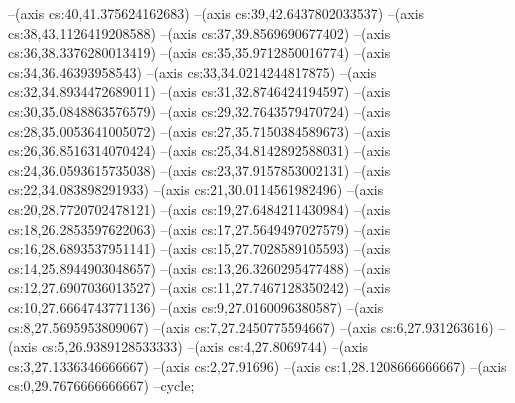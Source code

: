 --(axis cs:40,41.375624162683)
--(axis cs:39,42.6437802033537)
--(axis cs:38,43.1126419208588)
--(axis cs:37,39.8569690677402)
--(axis cs:36,38.3376280013419)
--(axis cs:35,35.9712850016774)
--(axis cs:34,36.46393958543)
--(axis cs:33,34.0214244817875)
--(axis cs:32,34.8934472689011)
--(axis cs:31,32.8746424194597)
--(axis cs:30,35.0848863576579)
--(axis cs:29,32.7643579470724)
--(axis cs:28,35.0053641005072)
--(axis cs:27,35.7150384589673)
--(axis cs:26,36.8516314070424)
--(axis cs:25,34.8142892588031)
--(axis cs:24,36.0593615735038)
--(axis cs:23,37.9157853002131)
--(axis cs:22,34.083898291933)
--(axis cs:21,30.0114561982496)
--(axis cs:20,28.7720702478121)
--(axis cs:19,27.6484211430984)
--(axis cs:18,26.2853597622063)
--(axis cs:17,27.5649497027579)
--(axis cs:16,28.6893537951141)
--(axis cs:15,27.7028589105593)
--(axis cs:14,25.8944903048657)
--(axis cs:13,26.3260295477488)
--(axis cs:12,27.6907036013527)
--(axis cs:11,27.7467128350242)
--(axis cs:10,27.6664743771136)
--(axis cs:9,27.0160096380587)
--(axis cs:8,27.5695953809067)
--(axis cs:7,27.2450775594667)
--(axis cs:6,27.931263616)
--(axis cs:5,26.9389128533333)
--(axis cs:4,27.8069744)
--(axis cs:3,27.1336346666667)
--(axis cs:2,27.91696)
--(axis cs:1,28.1208666666667)
--(axis cs:0,29.7676666666667)
--cycle;

